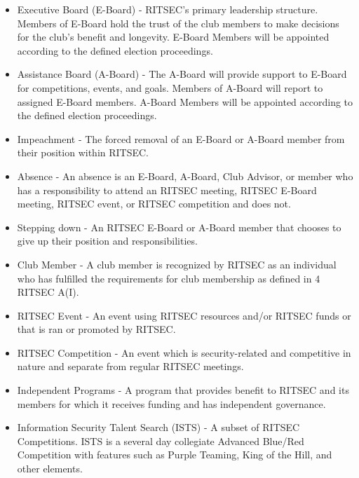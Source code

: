 \begin{itemize}
      \item Executive Board (E-Board) - RITSEC's primary leadership structure. Members of
            E-Board hold the trust of the club members to make decisions for the club's
            benefit and longevity. E-Board Members will be appointed according to the
            defined election proceedings.

      \item Assistance Board (A-Board) - The A-Board will provide support to E-Board for
            competitions, events, and goals. Members of A-Board will report to assigned
            E-Board members. A-Board Members will be appointed according to the defined
            election proceedings.

      \item Impeachment - The forced removal of an E-Board or A-Board member from their
            position within RITSEC.

      \item Absence - An absence is an E-Board, A-Board, Club Advisor, or member who has a
            responsibility to attend an RITSEC meeting, RITSEC E-Board meeting, RITSEC
            event, or RITSEC competition and does not.

      \item Stepping down - An RITSEC E-Board or A-Board member that chooses to give up
            their position and responsibilities.

      \item Club Member - A club member is recognized by RITSEC as an individual who has
            fulfilled the requirements for club membership as defined in 4 RITSEC A(I).

      \item RITSEC Event - An event using RITSEC resources and/or RITSEC funds or that is
            ran or promoted by RITSEC.

      \item RITSEC Competition - An event which is security-related and competitive in
            nature and separate from regular RITSEC meetings.

      \item Independent Programs - A program that provides benefit to RITSEC and its
            members for which it receives funding and has independent governance.

      \item Information Security Talent Search (ISTS) - A subset of RITSEC Competitions.
            ISTS is a several day collegiate Advanced Blue/Red Competition with features
            such as Purple Teaming, King of the Hill, and other elements.


\end{itemize}
